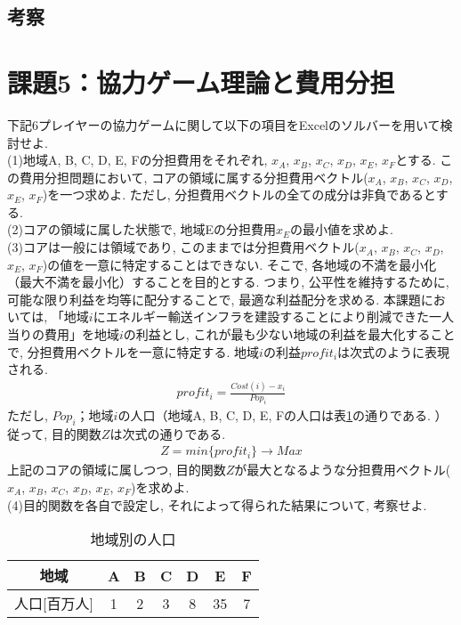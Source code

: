 \documentclass[]{jsarticle}
\begin{document}

  \subsection{考察}


\section{課題5：協力ゲーム理論と費用分担}
  \begin{screen}
    下記6プレイヤーの協力ゲームに関して以下の項目をExcelのソルバーを用いて検討せよ. \\
    (1)地域A, B, C, D, E, Fの分担費用をそれぞれ, $x_A$, $x_B$, $x_C$, $x_D$, $x_E$, $x_F$とする. この費用分担問題において, コアの領域に属する分担費用ベクトル($x_A$, $x_B$, $x_C$, $x_D$, $x_E$, $x_F$)を一つ求めよ. ただし, 分担費用ベクトルの全ての成分は非負であるとする. \\
    (2)コアの領域に属した状態で, 地域Eの分担費用$x_E$の最小値を求めよ. \\
    (3)コアは一般には領域であり, このままでは分担費用ベクトル($x_A$, $x_B$, $x_C$, $x_D$, $x_E$, $x_F$)の値を一意に特定することはできない. そこで, 各地域の不満を最小化（最大不満を最小化）することを目的とする. つまり, 公平性を維持するために, 可能な限り利益を均等に配分することで, 最適な利益配分を求める. 本課題においては, 「地域$i$にエネルギー輸送インフラを建設することにより削減できた一人当りの費用」を地域$i$の利益とし, これが最も少ない地域の利益を最大化することで, 分担費用ベクトルを一意に特定する. 地域$i$の利益$profit_i$は次式のように表現される.
      \begin{eqnarray}
        \label{profit}
        profit_i = \frac{Cost({i})-x_i}{Pop_i}
      \end{eqnarray}
    ただし, $Pop_i$；地域$i$の人口（地域A, B, C, D, E, Fの人口は表\ref{popi}の通りである. ）\\
    従って, 目的関数$Z$は次式の通りである.
      \begin{eqnarray}
        Z = min\{profit_i\} \to Max
      \end{eqnarray}
    上記のコアの領域に属しつつ, 目的関数$Z$が最大となるような分担費用ベクトル($x_A$, $x_B$, $x_C$, $x_D$, $x_E$, $x_F$)を求めよ. \\
    (4)目的関数を各自で設定し, それによって得られた結果について, 考察せよ.
  \end{screen}

  \begin{table}
    \begin{center}
      \caption{地域別の人口\cite{t}}
      \begin{tabular}{|c|c|c|c|c|c|c|} \hline
        地域 & A & B & C & D & E & F \\ \hline
        人口[百万人] & 1 & 2 & 3 & 8 & 35 & 7 \\ \hline
      \end{tabular}
      \label{popi}
    \end{center}
  \end{table}
\end{document}
